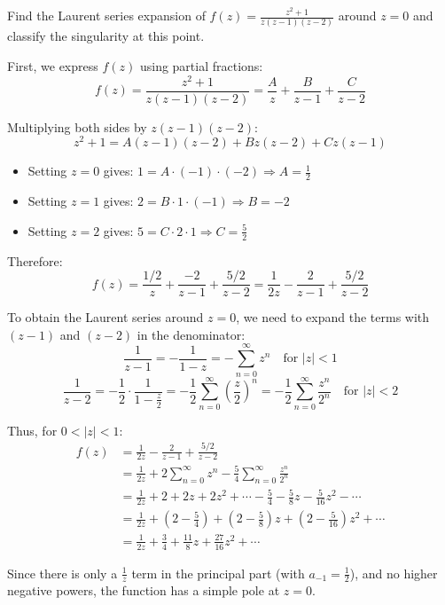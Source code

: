 \exampleline
\begin{example}
Find the Laurent series expansion of $f(z) = \frac{z^2+1}{z(z-1)(z-2)}$ around $z = 0$ and classify the singularity at this point.

\begin{solution}
\noindent First, we express $f(z)$ using partial fractions:
\[
f(z) = \frac{z^2+1}{z(z-1)(z-2)} = \frac{A}{z} + \frac{B}{z-1} + \frac{C}{z-2}
\]

\noindent Multiplying both sides by $z(z-1)(z-2)$:
\[
z^2+1 = A(z-1)(z-2) + Bz(z-2) + Cz(z-1)
\]

\begin{itemize}
\item Setting $z = 0$ gives: $1 = A \cdot (-1) \cdot (-2) \Rightarrow A = \frac{1}{2}$

\item Setting $z = 1$ gives: $2 = B \cdot 1 \cdot (-1) \Rightarrow B = -2$

\item Setting $z = 2$ gives: $5 = C \cdot 2 \cdot 1 \Rightarrow C = \frac{5}{2}$
\end{itemize}
\noindent Therefore:
\[
f(z) = \frac{1/2}{z} + \frac{-2}{z-1} + \frac{5/2}{z-2} = \frac{1}{2z} - \frac{2}{z-1} + \frac{5/2}{z-2}
\]

\noindent To obtain the Laurent series around $z = 0$, we need to expand the terms with $(z-1)$ and $(z-2)$ in the denominator:
\[
\frac{1}{z-1} = -\frac{1}{1-z} = -\sum_{n=0}^{\infty} z^n \quad \text{for } |z| < 1
\]
\[
\frac{1}{z-2} = -\frac{1}{2} \cdot \frac{1}{1-\frac{z}{2}} = -\frac{1}{2}\sum_{n=0}^{\infty} \left(\frac{z}{2}\right)^n = -\frac{1}{2}\sum_{n=0}^{\infty} \frac{z^n}{2^n} \quad \text{for } |z| < 2
\]

\noindent Thus, for $0 < |z| < 1$:
\begin{align*}
f(z) &= \frac{1}{2z} - \frac{2}{z-1} + \frac{5/2}{z-2} \\
&= \frac{1}{2z} + 2\sum_{n=0}^{\infty} z^n - \frac{5}{4}\sum_{n=0}^{\infty} \frac{z^n}{2^n} \\
&= \frac{1}{2z} + 2 + 2z + 2z^2 + \cdots - \frac{5}{4} - \frac{5}{8}z - \frac{5}{16}z^2 - \cdots \\
&= \frac{1}{2z} + \left(2 - \frac{5}{4}\right) + \left(2 - \frac{5}{8}\right)z + \left(2 - \frac{5}{16}\right)z^2 + \cdots \\
&= \frac{1}{2z} + \frac{3}{4} + \frac{11}{8}z + \frac{27}{16}z^2 + \cdots
\end{align*}

\noindent Since there is only a $\frac{1}{z}$ term in the principal part (with $a_{-1} = \frac{1}{2}$), and no higher negative powers, the function has a simple pole at $z = 0$.
\end{solution}
\end{example}
\exampleline


